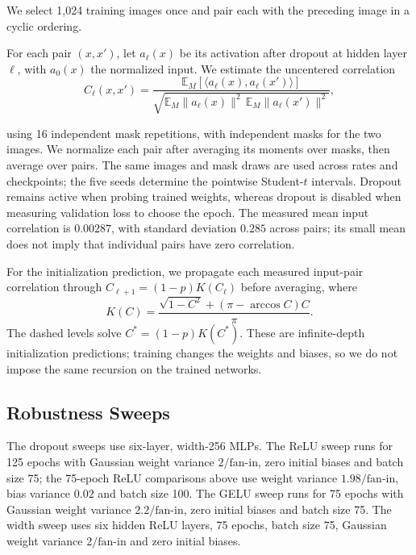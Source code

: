 We select 1,024 training images once and pair each with the preceding image in a cyclic ordering.
\begin{samepage}
For each pair $(x,x')$, let $a_\ell(x)$ be its activation after dropout at hidden layer $\ell$, with $a_0(x)$ the normalized input. We estimate the uncentered correlation
\begin{equation}
 C_\ell(x,x')=
 \frac{\mathbb E_M[\langle a_\ell(x),a_\ell(x')\rangle]}
 {\sqrt{\mathbb E_M\|a_\ell(x)\|^2\,\mathbb E_M\|a_\ell(x')\|^2}},
\end{equation}
\end{samepage}
using 16 independent mask repetitions, with independent masks for the two images. We normalize each pair after averaging its moments over masks, then average over pairs. The same images and mask draws are used across rates and checkpoints; the five seeds determine the pointwise Student-$t$ intervals. Dropout remains active when probing trained weights, whereas dropout is disabled when measuring validation loss to choose the epoch. The measured mean input correlation is $0.00287$, with standard deviation $0.285$ across pairs; its small mean does not imply that individual pairs have zero correlation.

For the initialization prediction, we propagate each measured input-pair correlation through $C_{\ell+1}=(1-p)K(C_\ell)$ before averaging, where
\begin{equation}
 K(C)=\frac{\sqrt{1-C^2}+(\pi-\arccos C)C}{\pi}.
\end{equation}
The dashed levels solve $C^*=(1-p)K(C^*)$. These are infinite-depth initialization predictions; training changes the weights and biases, so we do not impose the same recursion on the trained networks.

\suppressfloats[t]
\subsection{Robustness Sweeps}
\label{app:sweeps}
\setlength{\textfloatsep}{6pt plus 1pt minus 2pt}
\setlength{\floatsep}{6pt plus 1pt minus 2pt}
\setlength{\dbltextfloatsep}{6pt plus 1pt minus 2pt}
\setlength{\dblfloatsep}{6pt plus 1pt minus 2pt}

The dropout sweeps use six-layer, width-256 MLPs. The ReLU sweep runs for 125 epochs with Gaussian weight variance $2/\mathrm{fan\mbox{-}in}$, zero initial biases and batch size 75; the 75-epoch ReLU comparisons above use weight variance $1.98/\mathrm{fan\mbox{-}in}$, bias variance $0.02$ and batch size 100. The GELU sweep runs for 75 epochs with Gaussian weight variance $2.2/\mathrm{fan\mbox{-}in}$, zero initial biases and batch size 75. The width sweep uses six hidden ReLU layers, 75 epochs, batch size 75, Gaussian weight variance $2/\mathrm{fan\mbox{-}in}$ and zero initial biases.

